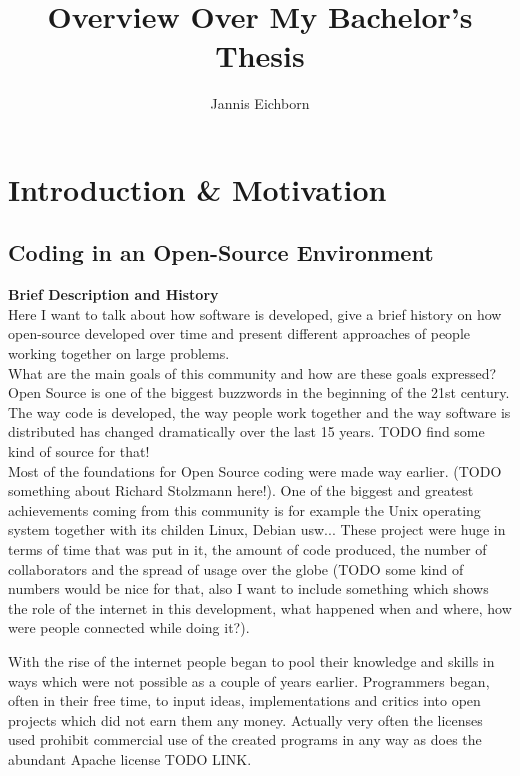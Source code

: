 \documentclass[twoside, 11pt]{scrartcl}
\title{Overview Over My Bachelor's Thesis}
\author{Jannis Eichborn}
\begin{document}
\begin{titlepage}
\maketitle
\tableofcontents
\end{titlepage}

\section{Introduction \& Motivation}
\label{sec:introduction}
\subsection{Coding in an Open-Source Environment}

\textbf{Brief Description and History}\\
Here I want to talk about how software is developed, give a brief history on how open-source developed over time and present different approaches of people working together on large problems. \\
What are the main goals of this community and how are these goals expressed?\\

Open Source is one of the biggest buzzwords in the beginning of the 21st century. The way code is developed, the way people work together and the way software is distributed has changed dramatically over the last 15 years. TODO find some kind of source for that!\\

Most of the foundations for Open Source coding were made way earlier. (TODO something about Richard Stolzmann here!). One of the biggest and greatest achievements coming from this community is for example the Unix operating system together with its childen Linux, Debian usw...
These project were huge in terms of time that was put in it, the amount of code produced, the number of collaborators and the spread of usage over the globe (TODO some kind of numbers would be nice for that, also I want to include something which shows the role of the internet in this development, what happened when and where, how were people connected while doing it?).

With the rise of the internet people began to pool their knowledge and skills in ways which were not possible as a couple of years earlier. Programmers began, often in their free time, to input ideas, implementations and critics into open projects which did not earn them any money. Actually very often the licenses used prohibit commercial use of the created programs in any way as does the abundant Apache license TODO LINK.
\end{document}
